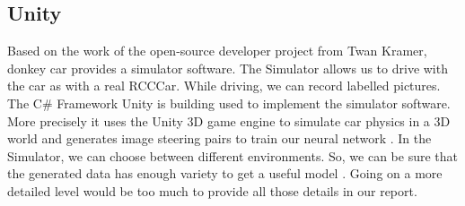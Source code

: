 \documentclass[journal]{IEEEtran}
\begin{document}
\subsection{Unity}

Based on the work of the open-source developer project from Twan Kramer, donkey car provides a simulator software. The Simulator allows us to drive with the car as with a real RCC\-Car. While driving, we can record labelled pictures. The C\# Framework Unity is building used to implement the simulator software. More precisely it uses the Unity 3D game engine to simulate car physics in a 3D world and generates image steering pairs to train our neural network \cite{sdsandbox}. In the Simulator, we can choose between different environments. So, we can be sure that the generated data has enough variety to get a useful model \cite{contributionOfVariables}. Going on a more detailed level would be too much to provide all those details in our report. 
\end{document}
